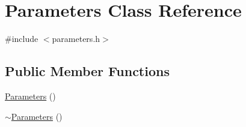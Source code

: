 \hypertarget{class_parameters}{}\section{Parameters Class Reference}
\label{class_parameters}


{\ttfamily \#include $<$parameters.\+h$>$}

\subsection*{Public Member Functions}
\begin{DoxyCompactItemize}
\item 
\mbox{\hyperlink{class_parameters_af4d94ee360ac0157d9065f78797fe9a1}{Parameters}} ()
\item 
\mbox{\hyperlink{class_parameters_a640a1a349975a8cb023696f25e563a5c}{$\sim$\+Parameters}} ()
\end{DoxyCompactItemize}

